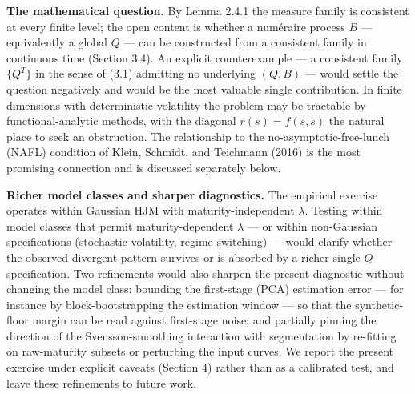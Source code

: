 \documentclass[
]{article}
\begin{document}
\textbf{The mathematical question.} By Lemma 2.4.1 the measure family is
consistent at every finite level; the open content is whether a
numéraire process \(B\) --- equivalently a global \(Q\) --- can be
constructed from a consistent family in continuous time (Section 3.4).
An explicit counterexample --- a consistent family \(\{Q^T\}\) in the
sense of (3.1) admitting no underlying \((Q, B)\) --- would settle the
question negatively and would be the most valuable single contribution.
In finite dimensions with deterministic volatility the problem may be
tractable by functional-analytic methods, with the diagonal
\(r(s) = f(s,s)\) the natural place to seek an obstruction. The
relationship to the no-asymptotic-free-lunch (NAFL) condition of Klein,
Schmidt, and Teichmann (2016) is the most promising connection and is
discussed separately below.

\textbf{Richer model classes and sharper diagnostics.} The empirical
exercise operates within Gaussian HJM with maturity-independent
\(\lambda\). Testing within model classes that permit maturity-dependent
\(\lambda\) \citep{Duffee2002,JoslinSingletonZhu2011} --- or within
non-Gaussian specifications (stochastic volatility, regime-switching)
--- would clarify whether the observed divergent pattern survives or is
absorbed by a richer single-\(Q\) specification. Two refinements would
also sharpen the present diagnostic without changing the model class:
bounding the first-stage (PCA) estimation error --- for instance by
block-bootstrapping the estimation window --- so that the
synthetic-floor margin can be read against first-stage noise; and
partially pinning the direction of the Svensson-smoothing interaction
with segmentation by re-fitting on raw-maturity subsets or perturbing
the input curves. We report the present exercise under explicit caveats
(Section 4) rather than as a calibrated test, and leave these
refinements to future work.
\end{document}
